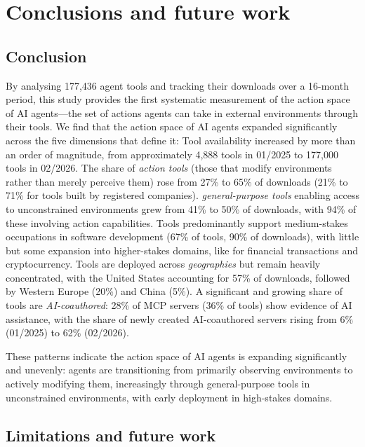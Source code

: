 \documentclass[manuscript,screen,nonacm,oneside]{acmart}
\begin{document}
\section{Conclusions and future work}
\label{sec:conclusions}

\subsection{Conclusion}

By analysing 177,436 agent tools and tracking their downloads over a 16-month period, this study provides the first systematic measurement of the action space of AI agents---the set of actions agents can take in external environments through their tools. We find that the action space of AI agents expanded significantly across the five dimensions that define it: Tool availability increased by more than an order of magnitude, from approximately 4,888 tools in 01/2025 to 177,000 tools in 02/2026. The share of \emph{action tools} (those that modify environments rather than merely perceive them) rose from 27\% to 65\% of downloads (21\% to 71\% for tools built by registered companies). \emph{general-purpose tools} enabling access to unconstrained environments grew from 41\% to 50\% of downloads, with 94\% of these involving action capabilities. Tools predominantly support medium-stakes occupations in software development (67\% of tools, 90\% of downloads), with little but some expansion into higher-stakes domains, like for financial transactions and cryptocurrency. Tools are deployed across \emph{geographies} but remain heavily concentrated, with the United States accounting for 57\% of downloads, followed by Western Europe (20\%) and China (5\%). A significant and growing share of tools are \emph{AI-coauthored}: 28\% of MCP servers (36\% of tools) show evidence of AI assistance, with the share of newly created AI-coauthored servers rising from 6\% (01/2025) to 62\% (02/2026).

These patterns indicate the action space of AI agents is expanding significantly and unevenly: agents are transitioning from primarily observing environments to actively modifying them, increasingly through general-purpose tools in unconstrained environments, with early deployment in high-stakes domains.

\subsection{Limitations and future work}
\end{document}

